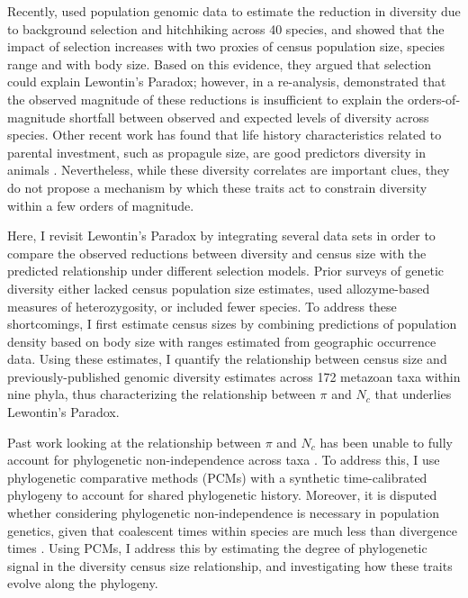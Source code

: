 \documentclass[9pt,lineno]{elife}
\begin{document}
Recently, \cite{Corbett-Detig2015-gt} used population genomic data to estimate
the reduction in diversity due to background selection and hitchhiking across
40 species, and showed that the impact of selection increases with two proxies
of census population size, species range and with body size. Based on this
evidence, they argued that selection could explain Lewontin's Paradox; however,
in a re-analysis, \cite{Coop2016-gx} demonstrated that the observed magnitude
of these reductions is insufficient to explain the orders-of-magnitude
shortfall between observed and expected levels of diversity across species.
Other recent work has found that life history characteristics related to
parental investment, such as propagule size, are good predictors diversity in
animals \citep{Romiguier2014-bp,Chen2017-nf}.  Nevertheless, while these
diversity correlates are important clues, they do not propose a mechanism by
which these traits act to constrain diversity within a few orders of magnitude. 

Here, I revisit Lewontin's Paradox by integrating several data sets in order to
compare the observed reductions between diversity and census size with the
predicted relationship under different selection models. Prior surveys of
genetic diversity either lacked census population size estimates, used
allozyme-based measures of heterozygosity, or included fewer species. To
address these shortcomings, I first estimate census sizes by combining
predictions of population density based on body size with ranges estimated from
geographic occurrence data. Using these estimates, I quantify the relationship
between census size and previously-published genomic diversity estimates across
172 metazoan taxa within nine phyla, thus characterizing the relationship
between $\pi$ and $N_c$ that underlies Lewontin's Paradox. 

Past work looking at the relationship between $\pi$ and $N_c$ has been unable
to fully account for phylogenetic non-independence across taxa
\citep{Felsenstein1985-an}. To address this, I use phylogenetic comparative
methods (PCMs) with a synthetic time-calibrated phylogeny to account for shared
phylogenetic history. Moreover, it is disputed whether considering phylogenetic
non-independence is necessary in population genetics, given that coalescent
times within species are much less than divergence times
\citep{Whitney2010-ud,Lynch2011-qv}. Using PCMs, I address this by estimating
the degree of phylogenetic signal in the diversity census size relationship,
and investigating how these traits evolve along the phylogeny.
\end{document}
